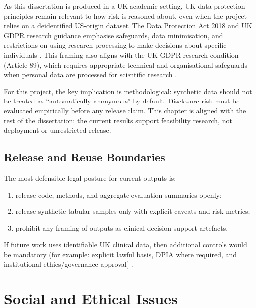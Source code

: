 As this dissertation is produced in a UK academic setting, UK data-protection principles remain relevant to how risk is reasoned about, even when the project relies on a deidentified US-origin dataset. The Data Protection Act 2018 and UK GDPR research guidance emphasise safeguards, data minimisation, and restrictions on using research processing to make decisions about specific individuals \cite{dataProtectionAct2018,icoResearchSafeguards,icoDataMinimisation}. This framing also aligns with the UK GDPR research condition (Article 89), which requires appropriate technical and organisational safeguards when personal data are processed for scientific research \cite{icoResearchSafeguards}.

For this project, the key implication is methodological: synthetic data should not be treated as ``automatically anonymous'' by default. Disclosure risk must be evaluated empirically before any release claim. This chapter is aligned with the rest of the dissertation: the current results support feasibility research, not deployment or unrestricted release.

\subsection{Release and Reuse Boundaries}

The most defensible legal posture for current outputs is:
\begin{enumerate}\tightlist
    \item release code, methods, and aggregate evaluation summaries openly;
    \item release synthetic tabular samples only with explicit caveats and risk metrics;
    \item prohibit any framing of outputs as clinical decision support artefacts.
\end{enumerate}

If future work uses identifiable UK clinical data, then additional controls would be mandatory (for example: explicit lawful basis, DPIA where required, and institutional ethics/governance approval) \cite{icoResearchSafeguards}.

\section{Social and Ethical Issues}


